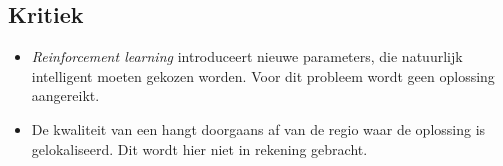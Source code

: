 \subsection{Kritiek}
\begin{itemize}
 \item \emph{Reinforcement learning} introduceert nieuwe parameters, die natuurlijk intelligent moeten gekozen worden. Voor dit probleem wordt geen oplossing aangereikt.
 \item De kwaliteit van een \abllh{} hangt doorgaans af van de regio waar de oplossing is gelokaliseerd. Dit wordt hier niet in rekening gebracht.
\end{itemize}
